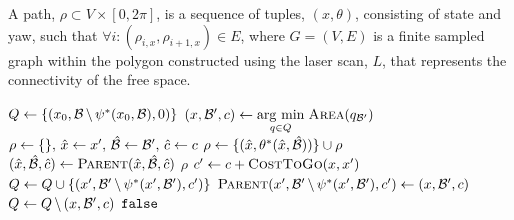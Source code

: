 \begin{definition}

    A path, $\rho \subset V \times [0, 2 \pi]$, is a sequence of tuples, $(x,
    \theta)$, consisting of state and yaw, such that $\forall
    i : (\rho_{i, x}, \rho_{i + 1, x}) \in E$, where $G = (V, E)$ is a finite
    sampled graph within the polygon constructed using the laser scan, $L$,
    that represents the connectivity of the free space.

\end{definition}

\begin{algorithm}[h!]
    \caption{}
    \label{algo:find_path}
    \begin{algorithmic}[1]
        \setcounter{ALC@line}{0}
        \vspace*{1mm}

        \STATE $Q \leftarrow \{(x_0, {{\mathcal{B}}} \, \backslash \, \psi^*(x_0, {{\mathcal{B}}}), 0)\}$
            \STATE $(x, {{\mathcal{B'}}}, c) \leftarrow \underset{q \in Q}{\operatorname{arg}\,\operatorname{min}}\; {\textsc{Area}}(q_{{{\mathcal{B'}}}})$
            \IF{$\Area(\B \, \backslash \, \rB) > \gamma \cdot \Area(\B)$}
                \STATE $\rho \leftarrow \{\}, \, \hat x \leftarrow x', \,
                    \hat {{{\mathcal{B}}}} \leftarrow {{\mathcal{B'}}}, \, \hat c \leftarrow c$
                    \STATE $\rho \leftarrow \{(\hat x,
                        \theta^*(\hat x, \hat {{{\mathcal{B}}}}))\} \cup \rho$
                    \STATE $(\hat x, \hat {{{\mathcal{B}}}}, \hat c) \leftarrow
                        {\textsc{Parent}}(\hat x, \hat {{{\mathcal{B}}}}, \hat c)$
                \ENDWHILE
                \RETURN $\rho$
            \ENDIF
                \STATE $c' \leftarrow c + {\textsc{CostToGo}}(x, x')$
                    \STATE $Q \leftarrow Q \cup \{(x', {{\mathcal{B'}}} \, \backslash \,
                        \psi^*(x', {{\mathcal{B'}}}), c')\}$
                    \STATE ${\textsc{Parent}}(x', {{\mathcal{B'}}} \, \backslash \,
                        \psi^*(x', {{\mathcal{B'}}}), c') \leftarrow (x, {{\mathcal{B'}}}, c)$
                \ENDIF
            \ENDFOR
            \STATE $Q \leftarrow Q \, \backslash \, (x, {{\mathcal{B'}}}, c)$
        \ENDWHILE
        \RETURN ${\texttt{false}}$

    \end{algorithmic}
\end{algorithm}

